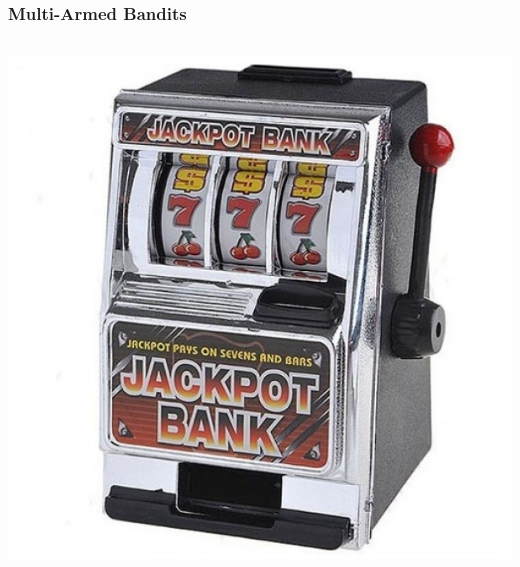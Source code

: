 \documentclass[fullscreen=true, bookmarks=true, hyperref={pdfencoding=unicode}]{beamer}
\begin{document}
\begin{frame}
  \frametitle{Multi-Armed Bandits}

  \begin{columns}
      \begin{column}{.25\paperwidth}
        \begin{center}
          \includegraphics[keepaspectratio,
                           width=.2\paperwidth]{data-kopilkabandit.jpg}


\end{center}
\end{column}
\end{columns}
\end{frame}
\end{document}
